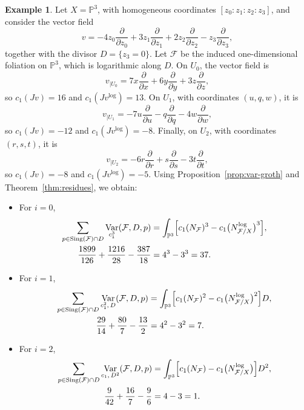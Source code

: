 \documentclass[12pt,reqno,a4paper]{amsart}
\numberwithin{equation}{section}
\theoremstyle{plain}
\theoremstyle{definition}
\newtheorem{example}[example]{Example}
\DeclareMathOperator{\Sing}{Sing}
\DeclareMathOperator{\Var}{Var}
\newcommand{\cF}{\mathcal{F}}
\begin{document}
\begin{example}
Let \(X=\mathbb P^3\), with homogeneous coordinates
\([z_0:z_1:z_2:z_3]\), and consider the vector field
\[
v
=
-4z_0\frac{\partial}{\partial z_0}
+
3z_1\frac{\partial}{\partial z_1}
+
2z_2\frac{\partial}{\partial z_2}
-
z_3\frac{\partial}{\partial z_3},
\]
together with the divisor \(D=\{z_3=0\}\). Let \(\cF\) be the induced
one-dimensional foliation on \(\mathbb P^3\), which is logarithmic along \(D\).
On \(U_0\), the vector field is
\[
v_{|U_0}
=
7x\frac{\partial}{\partial x}
+
6y\frac{\partial}{\partial y}
+
3z\frac{\partial}{\partial z},
\]
so \(c_1(Jv)=16\) and \(c_1(Jv^{\log})=13\). On \(U_1\), with coordinates
\((u,q,w)\), it is
\[
v_{|U_1}
=
-7u\frac{\partial}{\partial u}
-
q\frac{\partial}{\partial q}
-
4w\frac{\partial}{\partial w},
\]
so \(c_1(Jv)=-12\) and \(c_1(Jv^{\log})=-8\). Finally, on \(U_2\), with
coordinates \((r,s,t)\), it is
\[
v_{|U_2}
=
-6r\frac{\partial}{\partial r}
+
s\frac{\partial}{\partial s}
-
3t\frac{\partial}{\partial t},
\]
so \(c_1(Jv)=-8\) and \(c_1(Jv^{\log})=-5\).
Using Proposition~\ref{prop:var-groth} and Theorem~\ref{thm:residues}, we obtain:
\begin{itemize}
\item For \(i=0\),
\[
\begin{aligned}
\sum_{p\in \Sing(\cF)\cap D}\Var_{c_1^3}(\cF,D,p)
&=
\int_{\mathbb P^3}
\Bigl[
c_1(N_{\cF})^3
-
c_1\bigl(N^{\log}_{\cF/X}\bigr)^3
\Bigr],\\
\frac{1899}{126}+\frac{1216}{28}-\frac{387}{18}
&=
4^3-3^3=37.
\end{aligned}
\]

\item For \(i=1\),
\[
\begin{aligned}
\sum_{p\in \Sing(\cF)\cap D}
\Var_{c_1^2,\,D}(\cF,D,p)
&=
\int_{\mathbb P^3}
\Bigl[
c_1(N_{\cF})^2
-
c_1\bigl(N^{\log}_{\cF/X}\bigr)^2
\Bigr]D,\\
\frac{29}{14}+\frac{80}{7}-\frac{13}{2}
&=
4^2-3^2=7.
\end{aligned}
\]

\item For \(i=2\),
\[
\begin{aligned}
\sum_{p\in \Sing(\cF)\cap D}
\Var_{c_1,\,D^2}(\cF,D,p)
&=
\int_{\mathbb P^3}
\Bigl[
c_1(N_{\cF})
-
c_1\bigl(N^{\log}_{\cF/X}\bigr)
\Bigr]D^2,\\
\frac{9}{42}+\frac{16}{7}-\frac{9}{6}
&=
4-3=1.
\end{aligned}
\]
\end{itemize}
\end{example}
\end{document}
